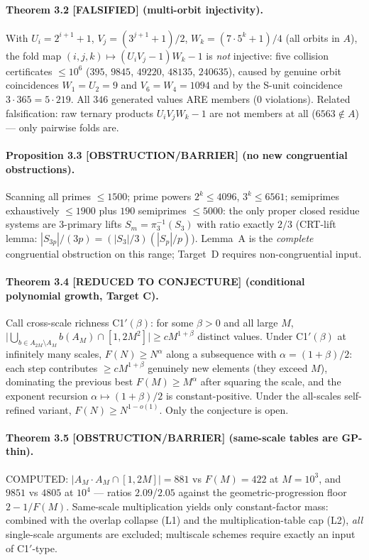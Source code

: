 \documentclass[11pt]{article}
\theoremstyle{definition}
\newcommand{\A}{A}
\newcommand{\F}{F}
\begin{document}
\paragraph{Theorem 3.2 [FALSIFIED] (multi-orbit injectivity).}
With $U_i=2^{i+1}+1$, $V_j=(3^{j+1}+1)/2$, $W_k=(7\cdot5^k+1)/4$ (all orbits
in $\A$), the fold map $(i,j,k)\mapsto(U_iV_j-1)W_k-1$ is \emph{not}
injective: five collision certificates $\le10^6$
($395$, $9845$, $49220$, $48135$, $240635$), caused by genuine orbit
coincidences $W_1=U_2=9$ and $V_6=W_4=1094$ and by the S-unit coincidence
$3\cdot365=5\cdot219$. All $346$ generated values ARE members
($0$ violations). Related falsification: raw ternary products
$U_iV_jW_k-1$ are not members at all ($6563\notin\A$) --- only pairwise
folds are.

\paragraph{Proposition 3.3 [OBSTRUCTION/BARRIER] (no new congruential obstructions).}
Scanning all primes ${\le}1500$; prime powers $2^k{\le}4096$,
$3^k{\le}6561$; semiprimes exhaustively ${\le}1900$ plus $190$ semiprimes
${\le}5000$: the only proper closed residue systems are 3-primary lifts
$S_m=\pi_3^{-1}(S_3)$ with ratio exactly $2/3$ (CRT-lift lemma:
$|S_{3p}|/(3p)=(|S_3|/3)(|S_p|/p)$). Lemma~A is the \emph{complete}
congruential obstruction on this range; Target~D requires non-congruential
input.

\paragraph{Theorem 3.4 [REDUCED TO CONJECTURE] (conditional polynomial growth, Target C).}
Call cross-scale richness C1$'(\beta)$: for some $\beta>0$ and all large $M$,
$\bigl|\bigcup_{b\in\A_{2M}\setminus\A_M} b(\A_M)\cap[1,2M^2]\bigr|
\ge cM^{1+\beta}$ distinct values. Under C1$'(\beta)$ at infinitely many
scales, $\F(N)\ge N^{\alpha}$ along a subsequence with
$\alpha=(1+\beta)/2$: each step contributes $\ge cM^{1+\beta}$ genuinely new
elements (they exceed $M$), dominating the previous best
$\F(M)\ge M^{\alpha}$ after squaring the scale, and the exponent recursion
$\alpha\mapsto(1+\beta)/2$ is constant-positive. Under the all-scales
self-refined variant, $\F(N)\ge N^{1-o(1)}$. Only the conjecture is open.

\paragraph{Theorem 3.5 [OBSTRUCTION/BARRIER] (same-scale tables are GP-thin).}
COMPUTED: $\bigl|\A_M\!\cdot\!\A_M\cap[1,2M]\bigr|=881$ vs $\F(M)=422$ at
$M=10^3$, and $9851$ vs $4805$ at $10^4$ --- ratios $2.09$/$2.05$ against
the geometric-progression floor $2-1/\F(M)$. Same-scale multiplication
yields only constant-factor mass: combined with the overlap collapse
(L1) and the multiplication-table cap (L2), \emph{all} single-scale
arguments are excluded; multiscale schemes require exactly an input of
C1$'$-type.
\end{document}
